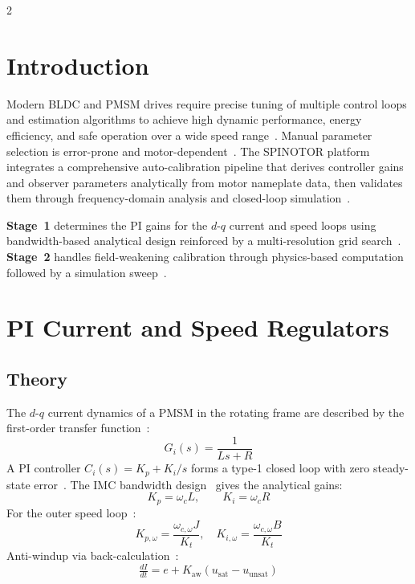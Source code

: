 \documentclass[10pt,twoside,a4paper]{article}
\begin{document}
\vspace{4pt}{\color{spinBlue}\hrule}\vspace{4pt}

\begin{multicols}{2}

\section{Introduction}\label{sec:intro}

Modern BLDC and PMSM drives require precise tuning of multiple control loops and
estimation algorithms to achieve high dynamic performance, energy efficiency, and
safe operation over a wide speed range~\cite{vas1998,novotny1996}. Manual parameter
selection is error-prone and motor-dependent~\cite{franklin2019}. The SPINOTOR
platform integrates a comprehensive auto-calibration pipeline that derives controller
gains and observer parameters analytically from motor nameplate data, then validates
them through frequency-domain analysis and closed-loop simulation~\cite{astrom2006}.

\textbf{Stage~1} determines the PI gains for the $d$-$q$ current and speed loops
using bandwidth-based analytical design reinforced by a multi-resolution grid
search~\cite{briz2000}.
\textbf{Stage~2} handles field-weakening calibration through physics-based computation
followed by a simulation sweep~\cite{zhu2007}.

\newpage
\section{PI Current and Speed Regulators}\label{sec:pi}

\subsection{Theory}

The $d$-$q$ current dynamics of a PMSM in the rotating frame are described by the
first-order transfer function~\cite{novotny1996,briz2000}:
\begin{equation}
  G_i(s) = \frac{1}{Ls+R}
\end{equation}
A PI controller $C_i(s)=K_p+K_i/s$ forms a type-1 closed loop with zero steady-state
error~\cite{franklin2019}. The IMC bandwidth design~\cite{astrom2006,holmes2003}
gives the analytical gains:
\begin{equation}
  K_p = \omega_c L,\qquad K_i = \omega_c R
\end{equation}
For the outer speed loop~\cite{kazmierkowski2002}:
\begin{equation}
  K_{p,\omega}=\frac{\omega_{c,\omega}J}{K_t},\quad K_{i,\omega}=\frac{\omega_{c,\omega}B}{K_t}
\end{equation}
Anti-windup via back-calculation~\cite{franklin2019}:
\begin{equation}
  \tfrac{dI}{dt}=e+K_\text{aw}(u_\text{sat}-u_\text{unsat})
\end{equation}


\end{multicols}
\end{document}
